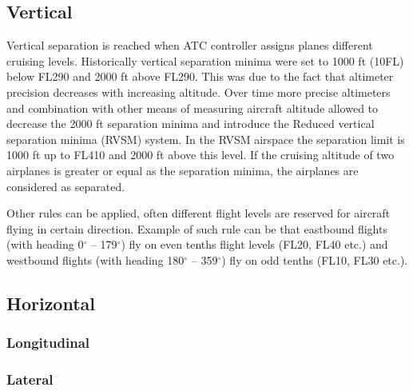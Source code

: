 \subsection{Vertical}

Vertical separation is reached when ATC controller assigns planes different cruising levels. Historically vertical separation minima were set to 1000 ft (10FL) below FL290 and 2000 ft above FL290. This was due to the fact that altimeter precision decreases with increasing altitude. Over time more precise altimeters and combination with other means of measuring aircraft altitude allowed to decrease the 2000 ft separation minima and introduce the Reduced vertical separation minima (RVSM) system. In the RVSM airspace the separation limit is 1000 ft up to FL410 and 2000 ft above this level. If the cruising altitude of two airplanes is greater or equal as the separation minima, the airplanes are considered as separated. \cite{aim}

Other rules can be applied, often different flight levels are reserved for aircraft flying in certain direction. Example of such rule can be that eastbound flights (with heading 0$^{\circ}$ – 179$^{\circ}$) fly on even tenths flight levels (FL20, FL40 etc.) and westbound flights (with heading 180$^{\circ}$ – 359$^{\circ}$) fly on odd tenths (FL10, FL30 etc.).


\subsection{Horizontal}
\subsubsection{Longitudinal}
\subsubsection{Lateral}






